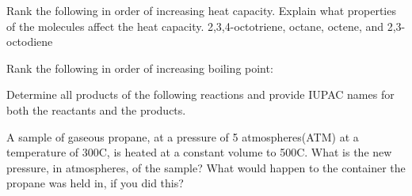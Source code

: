 \documentclass[addpoints, 12pt]{exam}
\begin{document}
\begin{questions}
\question[5] Rank the following in order of increasing heat capacity.
Explain what properties of the molecules affect the heat capacity.
2,3,4-octotriene, octane, octene, and 2,3-octodiene

\vspace{1cm}

\newpage
\question[10] Rank the following in order of increasing boiling point:
\vspace{1cm}


\question[20] Determine all products of the following reactions
and provide IUPAC names for both the reactants and the products.
\begin{parts}
\part 

\part 
\vspace{5cm}

\end{parts}
\vspace{5cm}




\question[10] A sample of gaseous propane, at a pressure of 5 atmospheres(ATM) at a
temperature of 300C, is heated at a constant volume to 500C.  What
is the new pressure, in atmospheres, of the sample?  What would happen
to the container the propane was held in, if you did this?
\vspace{2cm}





\end{questions}
\end{document}
